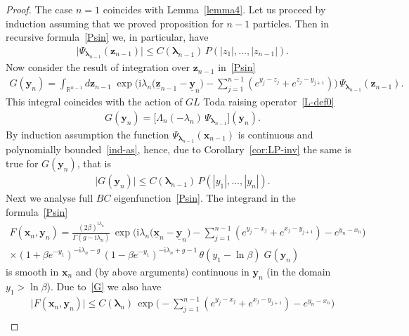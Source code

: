 \documentclass[11pt]{article}
\numberwithin{equation}{section}
\theoremstyle{plain}
\theoremstyle{definition}
\renewcommand{\imath}{\mathrm{i}}
\begin{document}
\begin{proof}
	The case $n = 1$ coincides with Lemma~\ref{lemma4}. Let us proceed by induction assuming that we proved proposition for $n - 1$ particles. Then in recursive formula~\eqref{Psin} we, in particular, have
	\begin{align} \label{ind-as}
		\bigl| \Psi_{\bm{\lambda}_{n - 1}}(\bm{z}_{n - 1}) \bigr| \leq C(\bm{\lambda}_{n - 1}) \, P(|z_1|, \dots, |z_{n - 1}|).
	\end{align}
	Now consider the result of integration over $\bm{z}_{n - 1}$ in~\eqref{Psin} 
	\begin{align}
		G(\bm{y}_n) = \int_{\mathbb{R}^{n - 1}} d\bm{z}_{n - 1} \; \exp \Biggl( \imath \lambda_n \bigl( \underline{\bm{z}}_{n - 1} - \underline{\bm{y}}_n \bigr) - \sum_{j = 1}^{n - 1} (e^{y_j - z_j} + e^{z_j - y_{j + 1}} ) \Biggr) \, \Psi_{\bm{\lambda}_{n - 1}}(\bm{z}_{n - 1}).
	\end{align}
	This integral coincides with the action of $GL$ Toda raising operator~\eqref{L-def0}
	\begin{align}
		G(\bm{y}_n) = \bigl[ \Lambda_n(-\lambda_n) \, \Psi_{\bm{\lambda}_{n - 1}} \bigr] (\bm{y}_n).
	\end{align}
	By induction assumption the function $\Psi_{\bm{\lambda}_{n - 1}} (\bm{x}_{n - 1})$ is continuous and polynomially bounded~\eqref{ind-as}, hence, due to Corollary~\ref{cor:LP-inv} the same is true for $G(\bm{y}_n)$, that is
	\begin{align} \label{G}
		\bigl| G(\bm{y}_{n }) \bigr| \leq C(\bm{\lambda}_{n - 1}) \, P(|y_1|, \dots, |y_{n}|).
	\end{align}
	Next we analyse full $BC$ eigenfunction~\eqref{Psin}. The integrand in the formula~\eqref{Psin} 
	\begin{multline} \label{F2}
		F(\bm{x}_n, \bm{y}_n) = \frac{(2\beta)^{\imath \lambda_n}}{\Gamma(g - \imath \lambda_n)} \,\exp \Biggl( \imath \lambda_n \bigl( \underline{\bm{x}}_n - \underline{\bm{y}}_n \bigr)	- \sum_{j = 1}^{n - 1} ( e^{y_j - x_j} + e^{x_j - y_{j + 1}} ) - e^{y_n - x_n} \Biggr) \\[6pt]
		\times (1 + \beta e^{-y_1})^{- \imath \lambda_n - g} \, (1 - \beta e^{-y_1})^{- \imath \lambda_n + g - 1} \, \theta(y_1 - \ln \beta) \; G(\bm{y}_{n})
	\end{multline}
	is smooth in $\bm{x}_n$ and (by above arguments) continuous in $\bm{y}_n$ (in the domain $y_1 > \ln \beta$). Due to~\eqref{G} we also have
	\begin{multline}\label{F2-b}
		\bigl| F(\bm{x}_n, \bm{y}_n) \bigr| \leq C(\bm{\lambda}_n) \, \exp \Biggl( - \sum_{j = 1}^{n - 1} ( e^{y_j - x_j} + e^{x_j - y_{j + 1}} ) - e^{y_n - x_n} \Biggr) \\[6pt]

\end{multline}
\end{proof}
\end{document}
